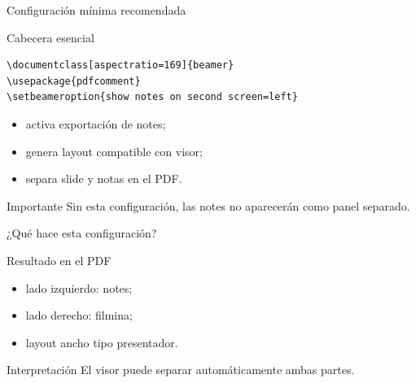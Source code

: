 \documentclass[aspectratio=169,professionalfonts]{beamer}
\begin{document}
\begin{frame}[fragile]{Configuración mínima recomendada}
\begin{block}{Cabecera esencial}
\begin{lstlisting}
\documentclass[aspectratio=169]{beamer}
\usepackage{pdfcomment}
\setbeameroption{show notes on second screen=left}
\end{lstlisting}
\end{block}

\begin{itemize}
  \item activa exportación de notes;
  \item genera layout compatible con visor;
  \item separa slide y notas en el PDF.
\end{itemize}

\begin{alertblock}{Importante}
Sin esta configuración, las notes no aparecerán como panel separado.
\end{alertblock}

\end{frame}

\begin{frame}{¿Qué hace esta configuración?}
\begin{block}{Resultado en el PDF}
\begin{itemize}
  \item lado izquierdo: notes;
  \item lado derecho: filmina;
  \item layout ancho tipo presentador.
\end{itemize}
\end{block}

\begin{exampleblock}{Interpretación}
El visor puede separar automáticamente ambas partes.
\end{exampleblock}

\end{frame}
\end{document}
